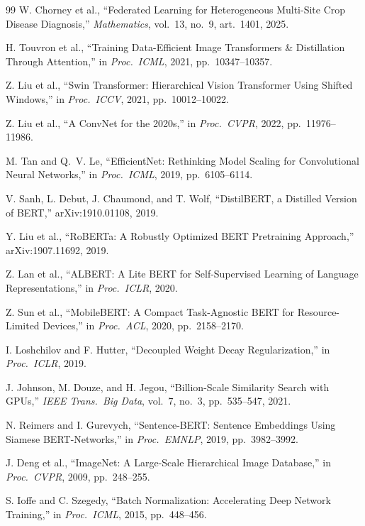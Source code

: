 \documentclass[12pt, a4paper, oneside]{Thesis}
\begin{document}
\begin{thebibliography}{99}
W. Chorney et al.,
``Federated Learning for Heterogeneous Multi-Site Crop Disease Diagnosis,''
\textit{Mathematics}, vol.\ 13, no.\ 9, art.\ 1401, 2025.

H. Touvron et al.,
``Training Data-Efficient Image Transformers \& Distillation Through Attention,''
in \textit{Proc.\ ICML}, 2021, pp.\ 10347--10357.

Z. Liu et al.,
``Swin Transformer: Hierarchical Vision Transformer Using Shifted Windows,''
in \textit{Proc.\ ICCV}, 2021, pp.\ 10012--10022.

Z. Liu et al.,
``A ConvNet for the 2020s,''
in \textit{Proc.\ CVPR}, 2022, pp.\ 11976--11986.

M. Tan and Q.~V. Le,
``EfficientNet: Rethinking Model Scaling for Convolutional Neural Networks,''
in \textit{Proc.\ ICML}, 2019, pp.\ 6105--6114.

V. Sanh, L. Debut, J. Chaumond, and T. Wolf,
``DistilBERT, a Distilled Version of BERT,''
arXiv:1910.01108, 2019.

Y. Liu et al.,
``RoBERTa: A Robustly Optimized BERT Pretraining Approach,''
arXiv:1907.11692, 2019.

Z. Lan et al.,
``ALBERT: A Lite BERT for Self-Supervised Learning of Language Representations,''
in \textit{Proc.\ ICLR}, 2020.

Z. Sun et al.,
``MobileBERT: A Compact Task-Agnostic BERT for Resource-Limited Devices,''
in \textit{Proc.\ ACL}, 2020, pp.\ 2158--2170.

I. Loshchilov and F. Hutter,
``Decoupled Weight Decay Regularization,''
in \textit{Proc.\ ICLR}, 2019.

J. Johnson, M. Douze, and H. Jegou,
``Billion-Scale Similarity Search with GPUs,''
\textit{IEEE Trans.\ Big Data}, vol.\ 7, no.\ 3, pp.\ 535--547, 2021.

N. Reimers and I. Gurevych,
``Sentence-BERT: Sentence Embeddings Using Siamese BERT-Networks,''
in \textit{Proc.\ EMNLP}, 2019, pp.\ 3982--3992.

J. Deng et al.,
``ImageNet: A Large-Scale Hierarchical Image Database,''
in \textit{Proc.\ CVPR}, 2009, pp.\ 248--255.

S. Ioffe and C. Szegedy,
``Batch Normalization: Accelerating Deep Network Training,''
in \textit{Proc.\ ICML}, 2015, pp.\ 448--456.


\end{thebibliography}
\end{document}
